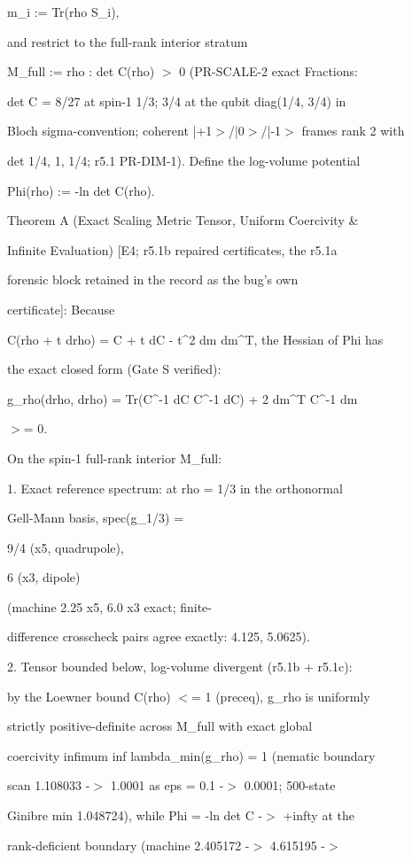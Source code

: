 \documentclass[11pt,a4paper]{article}
\theoremstyle{definition}
\begin{document}
    m\_i := Tr(rho S\_i),


and restrict to the full-rank interior stratum

M\_full := {rho : det C(rho) $>$ 0} (PR-SCALE-2 exact Fractions:

det C = 8/27 at spin-1 1/3; 3/4 at the qubit diag(1/4, 3/4) in

Bloch sigma-convention; coherent |+1$>$/|0$>$/|-1$>$ frames rank 2 with

det 1/4, 1, 1/4; r5.1 PR-DIM-1). Define the log-volume potential

Phi(rho) := -ln det C(rho).


Theorem A (Exact Scaling Metric Tensor, Uniform Coercivity \&

Infinite Evaluation) [E4; r5.1b repaired certificates, the r5.1a

forensic block retained in the record as the bug's own

certificate]: Because

C(rho + t drho) = C + t dC - t\^{}2 dm dm\^{}T, the Hessian of Phi has

the exact closed form (Gate S verified):


    g\_rho(drho, drho) = Tr(C\^{}{-1} dC C\^{}{-1} dC) + 2 dm\^{}T C\^{}{-1} dm

    $>$= 0.


On the spin-1 full-rank interior M\_full:


1. Exact reference spectrum: at rho = 1/3 in the orthonormal

   Gell-Mann basis, spec(g\_{1/3}) = {9/4 (x5, quadrupole),

   6 (x3, dipole)} (machine 2.25 x5, 6.0 x3 exact; finite-

   difference crosscheck pairs agree exactly: 4.125, 5.0625).

2. Tensor bounded below, log-volume divergent (r5.1b + r5.1c):

   by the Loewner bound C(rho) $<$= 1 (preceq), g\_rho is uniformly

   strictly positive-definite across M\_full with exact global

   coercivity infimum inf lambda\_min(g\_rho) = 1 (nematic boundary

   scan 1.108033 -$>$ 1.0001 as eps = 0.1 -$>$ 0.0001; 500-state

   Ginibre min 1.048724), while Phi = -ln det C -$>$ +infty at the

   rank-deficient boundary (machine 2.405172 -$>$ 4.615195 -$>$
\end{document}
